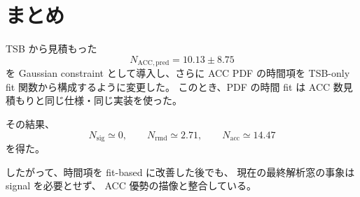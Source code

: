 \documentclass[a4paper,11pt]{jsarticle}
\begin{document}
\section{まとめ}
TSB から見積もった
\[
N_{\mathrm{ACC,pred}} = 10.13 \pm 8.75
\]
を Gaussian constraint として導入し、さらに ACC PDF の時間項を
TSB-only fit 関数から構成するように変更した。
このとき、PDF の時間 fit は ACC 数見積もりと同じ仕様・同じ実装を使った。

その結果、
\[
N_{\mathrm{sig}}\simeq 0,\qquad
N_{\mathrm{rmd}}\simeq 2.71,\qquad
N_{\mathrm{acc}}\simeq 14.47
\]
を得た。

したがって、時間項を fit-based に改善した後でも、
現在の最終解析窓の事象は signal を必要とせず、
ACC 優勢の描像と整合している。
\end{document}
